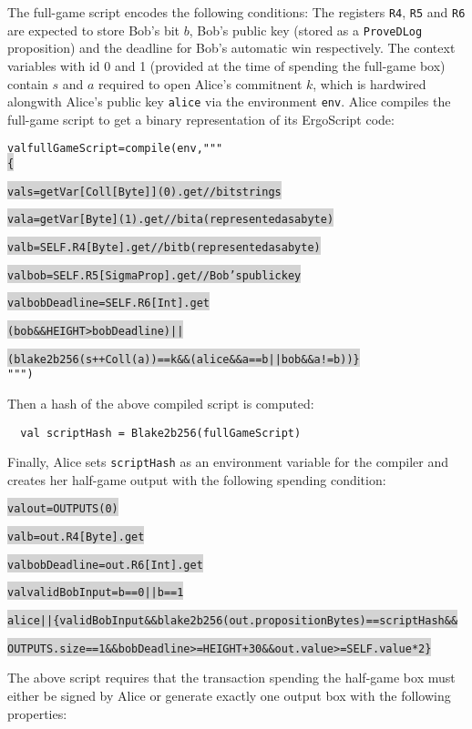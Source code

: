 \documentclass[11pt]{article}
\newcommand\Hi[2][lightgray]{%
	\hspace*{-\fboxsep}%
	\colorbox{#1}{#2}%
	\hspace*{-\fboxsep}%
}
\newcommand{\langname}{ErgoScript\xspace}
\begin{document}
The full-game script encodes the following conditions: The registers \texttt{R4}, \texttt{R5} and \texttt{R6} are expected to store Bob's bit $b$, Bob's public key (stored as a \texttt{ProveDLog} proposition) and the deadline for Bob's automatic win respectively. The context variables with id 0 and 1 (provided at the time of spending the full-game box) contain $s$ and $a$ required to open Alice's commitnent $k$, which is hardwired alongwith Alice's public key \texttt{alice} via the environment \texttt{env}. 
Alice compiles the full-game script to get a binary representation of its \langname code: 

\begin{alltt}
val fullGameScript = compile(env, """ \Hi{\{}
  \Hi{val s     = getVar[Coll[Byte]](0).get // bit string s}
  \Hi{val a     = getVar[Byte](1).get       // bit a (represented as a byte)}
  \Hi{val b     = SELF.R4[Byte].get         // bit b (represented as a byte)}
  \Hi{val bob   = SELF.R5[SigmaProp].get    // Bob's public key}
  \Hi{val bobDeadline = SELF.R6[Int].get}
   
  \Hi{(bob && HEIGHT > bobDeadline) || }
  \Hi{(blake2b256(s ++ Coll(a)) == k && (alice && a == b || bob && a != b)) \}} """)
\end{alltt}

Then a hash of the above compiled script is computed:

\begin{verbatim}
  val scriptHash = Blake2b256(fullGameScript)
\end{verbatim}

Finally, Alice sets \texttt{scriptHash} as an environment variable for the compiler and creates her half-game output with the following spending condition:

\begin{alltt}
  \Hi{val out           = OUTPUTS(0)}
  \Hi{val b             = out.R4[Byte].get}
  \Hi{val bobDeadline   = out.R6[Int].get}
  \Hi{val validBobInput = b == 0 || b == 1}

  \Hi{alice || \{ validBobInput && blake2b256(out.propositionBytes) == scriptHash &&}
  \Hi{OUTPUTS.size == 1 && bobDeadline >= HEIGHT+30 && out.value >= SELF.value * 2 \}}
\end{alltt}

The above script requires that the transaction spending the half-game box must either be signed by Alice or generate exactly one output box with the following properties:
\end{document}
